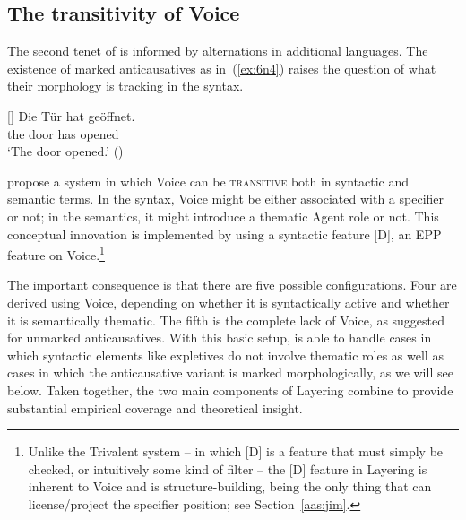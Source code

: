 \begin{exe}
\begin{xlist}
\begin{exe}
\begin{exe}
\begin{xlist}
	\subsection{The transitivity of Voice} \label{aas:layering:features}
The second tenet of  is informed by alternations in additional languages. The existence of marked anticausatives as in~(\ref{ex:6n4}) raises the question of what their morphology is tracking in the syntax.
 \begin{exe}
\ex   \label{ex:6n4}
[] 	{ \gll Die T\"ur hat  ge\"offnet.\\
 	  the door has  opened\\
 	\glt `The door opened.' \hfill () } 
	
 \z 

\cite{layering15} propose a system in which Voice can be \textsc{transitive} both in syntactic and semantic terms. In the syntax, Voice might be either associated with a specifier or not; in the semantics, it might introduce a thematic Agent role or not. This conceptual innovation is implemented by using a syntactic feature [D], an EPP feature on Voice.\footnote{Unlike the Trivalent system -- in which [D] is a feature that must simply be checked, or intuitively some kind of filter -- the [D] feature in Layering is inherent to Voice and is structure-building, being the only thing that can license/project the specifier position; see Section~\ref{aas:jim}.}

The important consequence is that there are five possible configurations. Four are derived using Voice, depending on whether it is syntactically active and whether it is semantically thematic. The fifth is the complete lack of Voice, as suggested for unmarked anticausatives. With this basic setup,  is able to handle cases in which syntactic elements like expletives do not involve thematic roles as well as cases in which the anticausative variant is marked morphologically, as we will see below. Taken together, the two main components of Layering combine to provide substantial empirical coverage and theoretical insight.


\end{exe}
\end{xlist}
\end{exe}
\end{exe}
\end{xlist}
\end{exe}
